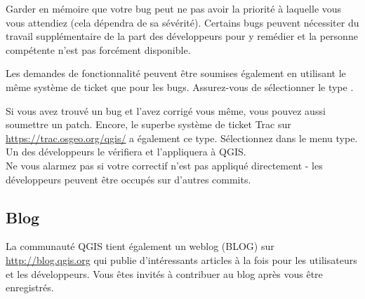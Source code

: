 Garder en m\'emoire que votre bug peut ne pas avoir la priorit\'e \`a laquelle vous
vous attendiez (cela d\'ependra de sa s\'ev\'erit\'e). Certains bugs peuvent n\'ecessiter du
travail suppl\'ementaire de la part des d\'eveloppeurs pour y rem\'edier et la personne
comp\'etente n'est pas forc\'ement disponible.

Les demandes de fonctionnalit\'e peuvent \^etre soumises \'egalement en utilisant le
m\^eme syst\`eme de ticket que pour les bugs. Assurez-vous de s\'electionner le type
.

Si vous avez trouv\'e un bug et l'avez corrig\'e vous m\^eme, vous pouvez
aussi soumettre un patch. Encore, le superbe syst\`eme de ticket Trac sur
\url{https://trac.osgeo.org/qgis/} a \'egalement ce type. S\'electionnez
 dans le menu type. Un des d\'eveloppeurs le v\'erifiera et
l'appliquera \`a QGIS.\\
Ne vous alarmez pas si votre correctif n'est pas appliqu\'e directement - les
d\'eveloppeurs peuvent \^etre occup\'es sur d'autres commits.


\subsection{Blog}
La communaut\'e QGIS tient \'egalement un weblog (BLOG) sur
\url{http://blog.qgis.org} qui publie d'int\'eressants articles \`a la fois pour les
utilisateurs et les d\'eveloppeurs. Vous \^etes invit\'es \`a contribuer au blog apr\`es
vous \^etre enregistr\'es.


